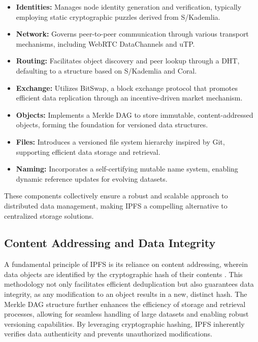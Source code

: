 \documentclass{article}
\begin{document}
\begin{itemize}
    \item \textbf{Identities:} Manages node identity generation and verification, typically employing static cryptographic puzzles derived from S/Kademlia.
    \item \textbf{Network:} Governs peer-to-peer communication through various transport mechanisms, including WebRTC DataChannels and uTP.
    \item \textbf{Routing:} Facilitates object discovery and peer lookup through a DHT, defaulting to a structure based on S/Kademlia and Coral.
    \item \textbf{Exchange:} Utilizes BitSwap, a block exchange protocol that promotes efficient data replication through an incentive-driven market mechanism.
    \item \textbf{Objects:} Implements a Merkle DAG to store immutable, content-addressed objects, forming the foundation for versioned data structures.
    \item \textbf{Files:} Introduces a versioned file system hierarchy inspired by Git, supporting efficient data storage and retrieval.
    \item \textbf{Naming:} Incorporates a self-certifying mutable name system, enabling dynamic reference updates for evolving datasets.
\end{itemize}

These components collectively ensure a robust and scalable approach to distributed data management, making IPFS a compelling alternative to centralized storage solutions.

\subsection{Content Addressing and Data Integrity}

A fundamental principle of IPFS is its reliance on content addressing, wherein data objects are identified by the cryptographic hash of their contents \cite{benet2014ipfs}. This methodology not only facilitates efficient deduplication but also guarantees data integrity, as any modification to an object results in a new, distinct hash. The Merkle DAG structure further enhances the efficiency of storage and retrieval processes, allowing for seamless handling of large datasets and enabling robust versioning capabilities. By leveraging cryptographic hashing, IPFS inherently verifies data authenticity and prevents unauthorized modifications.
\end{document}
